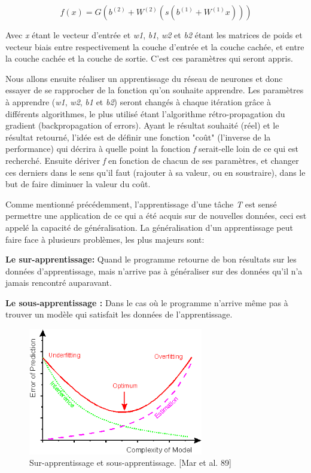 $$f(x) = G( b^{(2)} + W^{(2)}( s( b^{(1)} + W^{(1)} x)))$$

	Avec \textit{x} étant le vecteur d'entrée et \textit{w1}, \textit{ b1}, \textit{w2} et \textit{b2} étant les matrices de poids et vecteur biais entre respectivement la couche d'entrée et la couche cachée, et entre la couche cachée et la couche de sortie. C'est ces paramètres qui seront appris.
	
	Nous allons ensuite réaliser un apprentissage du réseau de neurones et donc essayer de se rapprocher de la fonction qu'on souhaite apprendre. Les paramètres à apprendre (\textit{w1}, \textit{ w2}, \textit{b1} et \textit{b2}) seront changés à chaque itération grâce à différents algorithmes, le plus utilisé étant l'algorithme rétro-propagation du gradient (backpropagation of errors). 
	Ayant le résultat souhaité (réel) et le résultat retourné, l'idée est de définir une fonction "coût" (l'inverse de la performance) qui décrira à quelle point la fonction \textit{f} serait-elle loin de ce qui est recherché. Ensuite dériver \textit{f} en fonction de chacun de ses paramètres, et changer ces derniers dans le sens qu'il faut (rajouter à sa valeur, ou en soustraire), dans le but de faire diminuer la valeur du coût.

	Comme mentionné précédemment, l'apprentissage d'une tâche \textit{T} est sensé permettre une application de ce qui a été acquis sur de nouvelles données, ceci est appelé la capacité de généralisation. La généralisation d'un apprentissage peut faire face à plusieurs problèmes, les plus majeurs sont:

\textbf{Le sur-apprentissage:} Quand le programme retourne de bon résultats sur les données d'apprentissage, mais n'arrive pas à généraliser sur des données qu'il n'a jamais rencontré auparavant.

\textbf{Le sous-apprentissage :} Dans le cas où le programme n'arrive même pas à trouver un modèle qui satisfait les données de l'apprentissage.


\begin{figure}[H]
	\centering
		\includegraphics[width=3in]{Figures/image024.png}
	\caption[An Electron]{Sur-apprentissage et sous-apprentissage. [Mar et al. 89]}
	\label{fig:Electron}
\end{figure}


